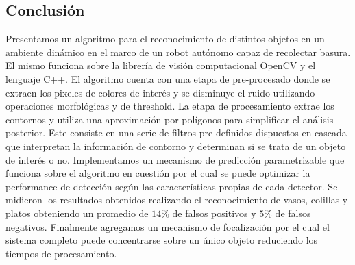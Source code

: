 \subsection{Conclusi\'on}
Presentamos un algoritmo para el reconocimiento de distintos objetos en 
un ambiente din\'amico en el marco de un robot aut\'onomo capaz de 
recolectar basura. El mismo funciona sobre la librer\'ia de visi\'on 
computacional OpenCV y el lenguaje C++.  El algoritmo cuenta
con una etapa de pre-procesado donde se extraen los pixeles de colores de inter\'es y se disminuye el ruido utilizando 
operaciones morfol\'ogicas y de threshold. La etapa de procesamiento extrae los contornos y utiliza una aproximaci\'on por pol\'igonos
para simplificar el an\'alisis posterior. Este consiste en una serie de 
filtros pre-definidos dispuestos en cascada que interpretan la 
informaci\'on de contorno y  determinan si se trata 
de un objeto de inter\'es o no. 
Implementamos un mecanismo de predicci\'on parametrizable que funciona 
sobre el algoritmo en cuesti\'on por el cual se puede optimizar la performance de 
detecci\'on seg\'un las caracter\'isticas propias de cada detector. Se 
midieron los resultados obtenidos realizando el reconocimiento de 
vasos, colillas y platos obteniendo un promedio de $14\%$ de falsos 
positivos  y $5\%$ de falsos negativos. Finalmente agregamos un mecanismo de focalizaci\'on por el cual 
el sistema completo puede concentrarse sobre un \'unico objeto reduciendo 
los tiempos de procesamiento. 


